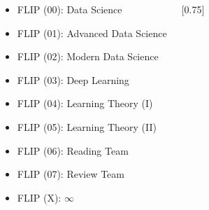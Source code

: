 \documentclass{tikzposter} %
\begin{document}
\begin{columns}
{\begin{minipage}[l]{0.6\linewidth}
{\begin{tikzpicture}[ every annotation/.style = {draw,
						fill = white}]
					\end{tikzpicture}
				}
			\end{minipage}
			\hfill
			\hspace{0.01\textwidth}
			\begin{minipage}[l]{0.4\linewidth}
				\vspace{-30pt}
				\begin{center}
					\begin{description}[font=\small]			
						\item[Flipper] \hfill
						\begin{itemize}
							\footnotesize
							\item FLIP (00): Data Science
							\item FLIP (01): Advanced Data Science
						\end{itemize}
						\item[Trainee] \hfill
						\begin{itemize}
							\footnotesize
							\item FLIP (02): Modern Data Science
							\item FLIP (03): Deep Learning
						\end{itemize}
						\item[$\infty$] \hfill
						\begin{itemize}
							\footnotesize
							\item FLIP (04): Learning Theory (I)
							\item FLIP (05): Learning Theory (II)
							\item FLIP (06): Reading Team
							\item FLIP (07): Review Team
							\item FLIP (X): $\infty$
						\end{itemize}
					\end{description}
				\end{center}				
			\end{minipage}
		}
		
		
		
		
		{
			\begin{minipage}[l]{0.55\linewidth}
				\vspace{-20pt}
				\scalebox{0.7}[0.75]{
					
}
\end{minipage}}
\end{columns}
\end{document}
